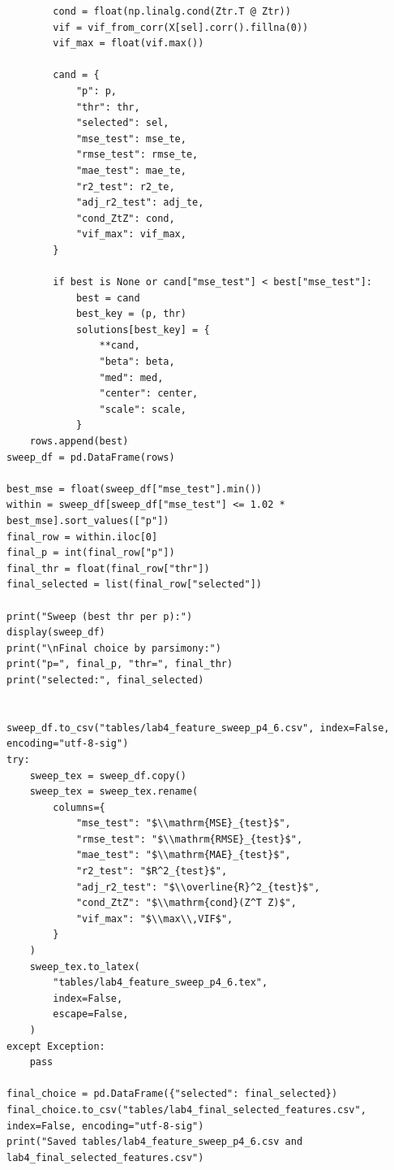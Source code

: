 \documentclass[a4paper, 14pt]{extarticle}
\begin{document}
\begin{longlisting}
\begin{verbatim}
        cond = float(np.linalg.cond(Ztr.T @ Ztr))
        vif = vif_from_corr(X[sel].corr().fillna(0))
        vif_max = float(vif.max())

        cand = {
            "p": p,
            "thr": thr,
            "selected": sel,
            "mse_test": mse_te,
            "rmse_test": rmse_te,
            "mae_test": mae_te,
            "r2_test": r2_te,
            "adj_r2_test": adj_te,
            "cond_ZtZ": cond,
            "vif_max": vif_max,
        }

        if best is None or cand["mse_test"] < best["mse_test"]:
            best = cand
            best_key = (p, thr)
            solutions[best_key] = {
                **cand,
                "beta": beta,
                "med": med,
                "center": center,
                "scale": scale,
            }
    rows.append(best)
sweep_df = pd.DataFrame(rows)

best_mse = float(sweep_df["mse_test"].min())
within = sweep_df[sweep_df["mse_test"] <= 1.02 * best_mse].sort_values(["p"])
final_row = within.iloc[0]
final_p = int(final_row["p"])
final_thr = float(final_row["thr"])
final_selected = list(final_row["selected"])

print("Sweep (best thr per p):")
display(sweep_df)
print("\nFinal choice by parsimony:")
print("p=", final_p, "thr=", final_thr)
print("selected:", final_selected)


sweep_df.to_csv("tables/lab4_feature_sweep_p4_6.csv", index=False, encoding="utf-8-sig")
try:
    sweep_tex = sweep_df.copy()
    sweep_tex = sweep_tex.rename(
        columns={
            "mse_test": "$\\mathrm{MSE}_{test}$",
            "rmse_test": "$\\mathrm{RMSE}_{test}$",
            "mae_test": "$\\mathrm{MAE}_{test}$",
            "r2_test": "$R^2_{test}$",
            "adj_r2_test": "$\\overline{R}^2_{test}$",
            "cond_ZtZ": "$\\mathrm{cond}(Z^T Z)$",
            "vif_max": "$\\max\\,VIF$",
        }
    )
    sweep_tex.to_latex(
        "tables/lab4_feature_sweep_p4_6.tex",
        index=False,
        escape=False,
    )
except Exception:
    pass

final_choice = pd.DataFrame({"selected": final_selected})
final_choice.to_csv("tables/lab4_final_selected_features.csv", index=False, encoding="utf-8-sig")
print("Saved tables/lab4_feature_sweep_p4_6.csv and lab4_final_selected_features.csv")


\end{verbatim}
\end{longlisting}
\end{document}
